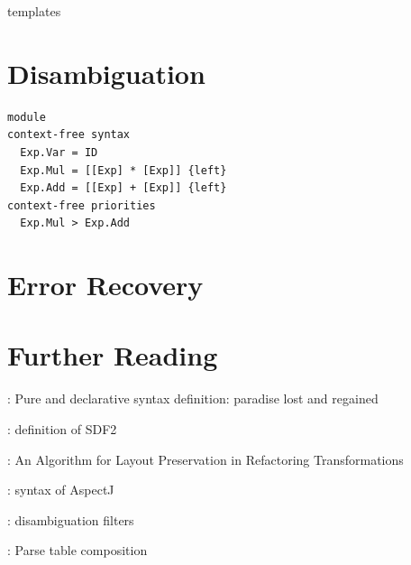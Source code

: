 templates \cite{VollebregtKV12}


\section{Disambiguation}

\begin{lstlisting}
module 
context-free syntax
  Exp.Var = ID
  Exp.Mul = [[Exp] * [Exp]] {left}
  Exp.Add = [[Exp] + [Exp]] {left}
context-free priorities
  Exp.Mul > Exp.Add
\end{lstlisting}

\section{Error Recovery}

\cite{JongeKVS12}


\section{Further Reading}

\cite{KatsVW10}: Pure and declarative syntax definition: paradise lost and
regained

\cite{Vis97.thesis}: definition of SDF2

\cite{JongeV11}: An Algorithm for Layout Preservation in Refactoring
Transformations

\cite{BravenboerTV06}: syntax of AspectJ

\cite{KlintV94,BrandSVV02}: disambiguation filters


\cite{BravenboerV08}: Parse table composition

